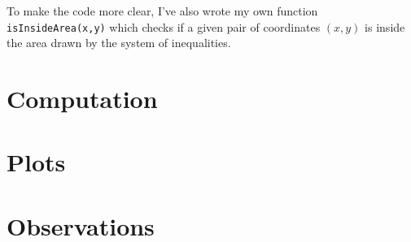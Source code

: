 \documentclass{article}
\newcommand{\code}{\texttt}
\begin{document}
To make the code more clear, I've also wrote my own function \code{isInsideArea(x,y)} which checks if a given pair of coordinates $(x, y)$ is inside the area drawn by the system of inequalities.

\section{Computation}
\section{Plots}
\section{Observations}
\end{document}
